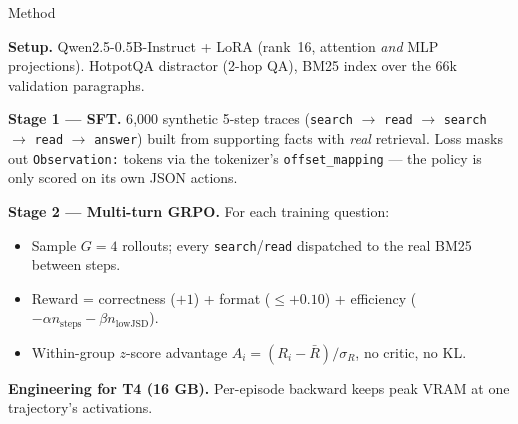 \documentclass[aspectratio=169]{beamer}
\begin{document}
\begin{frame}{Method}

\textbf{Setup.} Qwen2.5-0.5B-Instruct + LoRA (rank~16, attention
\emph{and} MLP projections). HotpotQA distractor (2-hop QA), BM25
index over the 66k validation paragraphs.

\vspace{0.5em}

\textbf{Stage 1 --- SFT.} 6{,}000 synthetic 5-step traces
(\texttt{search} $\to$ \texttt{read} $\to$ \texttt{search} $\to$
\texttt{read} $\to$ \texttt{answer}) built from supporting facts
with \emph{real} retrieval. Loss masks out
\texttt{Observation:} tokens via the tokenizer's
\texttt{offset\_mapping} --- the policy is only scored on its own
JSON actions.

\vspace{0.5em}

\textbf{Stage 2 --- Multi-turn GRPO.} For each training question:
\begin{itemize}
  \item Sample $G{=}4$ rollouts; \alert{every \texttt{search}/\texttt{read} dispatched to the real BM25} between steps.
  \item Reward = correctness ($+1$) + format ($\le +0.10$) + efficiency ($-\alpha n_\mathrm{steps}-\beta n_\mathrm{lowJSD}$).
  \item Within-group $z$-score advantage $A_i = (R_i - \bar R)/\sigma_R$, no critic, no KL.
\end{itemize}

\vspace{0.3em}

\textbf{Engineering for T4 (16 GB).} Per-episode backward keeps
peak VRAM at one trajectory's activations.

%
\end{frame}
\end{document}
